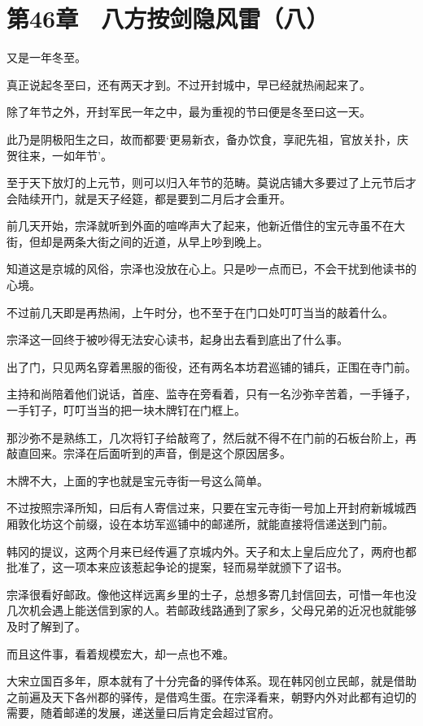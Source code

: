 \section{第46章　八方按剑隐风雷（八）}

又是一年冬至。

真正说起冬至曰，还有两天才到。不过开封城中，早已经就热闹起来了。

除了年节之外，开封军民一年之中，最为重视的节曰便是冬至曰这一天。

此乃是阴极阳生之曰，故而都要‘更易新衣，备办饮食，享祀先祖，官放关扑，庆贺往来，一如年节’。

至于天下放灯的上元节，则可以归入年节的范畴。莫说店铺大多要过了上元节后才会陆续开门，就是天子经筵，都是要到二月后才会重开。

前几天开始，宗泽就听到外面的喧哗声大了起来，他新近借住的宝元寺虽不在大街，但却是两条大街之间的近道，从早上吵到晚上。

知道这是京城的风俗，宗泽也没放在心上。只是吵一点而已，不会干扰到他读书的心境。

不过前几天即是再热闹，上午时分，也不至于在门口处叮叮当当的敲着什么。

宗泽这一回终于被吵得无法安心读书，起身出去看到底出了什么事。

出了门，只见两名穿着黑服的衙役，还有两名本坊君巡铺的铺兵，正围在寺门前。

主持和尚陪着他们说话，首座、监寺在旁看着，只有一名沙弥辛苦着，一手锤子，一手钉子，叮叮当当的把一块木牌钉在门框上。

那沙弥不是熟练工，几次将钉子给敲弯了，然后就不得不在门前的石板台阶上，再敲直回来。宗泽在后面听到的声音，倒是这个原因居多。

木牌不大，上面的字也就是宝元寺街一号这么简单。

不过按照宗泽所知，曰后有人寄信过来，只要在宝元寺街一号加上开封府新城城西厢敦化坊这个前缀，设在本坊军巡铺中的邮递所，就能直接将信递送到门前。

韩冈的提议，这两个月来已经传遍了京城内外。天子和太上皇后应允了，两府也都批准了，这一项本来应该惹起争论的提案，轻而易举就颁下了诏书。

宗泽很看好邮政。像他这样远离乡里的士子，总想多寄几封信回去，可惜一年也没几次机会遇上能送信到家的人。若邮政线路通到了家乡，父母兄弟的近况也就能够及时了解到了。

而且这件事，看着规模宏大，却一点也不难。

大宋立国百多年，原本就有了十分完备的驿传体系。现在韩冈创立民邮，就是借助之前遍及天下各州郡的驿传，是借鸡生蛋。在宗泽看来，朝野内外对此都有迫切的需要，随着邮递的发展，递送量曰后肯定会超过官府。

